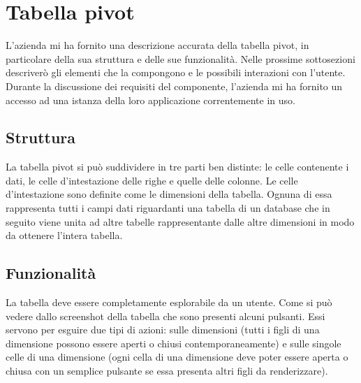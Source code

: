 \section{Tabella pivot}
L'azienda mi ha fornito una descrizione accurata della tabella pivot, in particolare della sua struttura e delle sue funzionalità. Nelle prossime sottosezioni descriverò gli elementi che la compongono e le possibili interazioni con l'utente. Durante la discussione dei requisiti del componente, l'azienda mi ha fornito un accesso ad una istanza della loro applicazione correntemente in uso. \\
\begin{minipage}{\linewidth}
\end{minipage}

\subsection{Struttura}
La tabella pivot si può suddividere in tre parti ben distinte: le celle contenente i dati, le celle d'intestazione delle righe e quelle delle colonne. 
Le celle d'intestazione sono definite come le dimensioni della tabella. Ognuna di essa rappresenta tutti i campi dati riguardanti una tabella di un database che in seguito viene unita ad altre tabelle rappresentante dalle altre dimensioni in modo da ottenere l'intera tabella.

\subsection{Funzionalità}
La tabella deve essere completamente esplorabile da un utente. Come si può vedere dallo screenshot della tabella che sono presenti alcuni pulsanti. Essi servono per esguire due tipi di azioni: sulle dimensioni (tutti i figli di una dimensione possono essere aperti o chiusi contemporaneamente) e sulle singole celle di una dimensione (ogni cella di una dimensione deve poter essere aperta o chiusa con un semplice pulsante se essa presenta altri figli da renderizzare).


